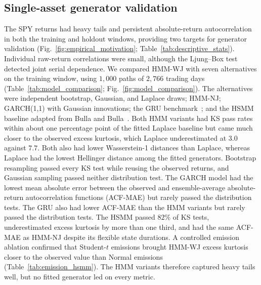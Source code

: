 \subsection{Single-asset generator validation}

The SPY returns had heavy tails and persistent absolute-return
autocorrelation in both the training and holdout windows, providing
two targets for generator validation
(Fig.~\ref{fig:empirical_motivation};
Table~\ref{tab:descriptive_stats}). Individual raw-return correlations
were small, although the Ljung--Box test detected joint serial
dependence. We compared HMM-WJ with seven alternatives on the training
window, using $1{,}000$ paths of $2{,}766$ trading days
(Table~\ref{tab:model_comparison}; Fig.~\ref{fig:model_comparison}).
The alternatives were independent bootstrap, Gaussian, and Laplace
draws; HMM-NJ; GARCH(1,1) with Gaussian innovations; the GRU
benchmark~\cite{choEtAl2014gru}; and the HSMM baseline adapted from
Bulla and Bulla~\cite{bullaBulla2006}. Both HMM variants had KS pass
rates within about one percentage point of the fitted Laplace
baseline but came much closer to the observed excess kurtosis, which
Laplace underestimated at $3.0$ against $7.7$. Both also had lower
Wasserstein-1 distances than Laplace, whereas Laplace had the lowest
Hellinger distance among the fitted generators. Bootstrap resampling
passed every KS test while reusing the observed returns, and Gaussian
sampling passed neither distribution test. The GARCH model had the
lowest mean absolute error between the observed and ensemble-average
absolute-return autocorrelation functions (ACF-MAE) but rarely passed
the distribution tests. The GRU also had lower ACF-MAE than the
HMM variants but rarely passed the distribution tests. The HSMM
passed $82\%$ of KS tests, underestimated excess kurtosis by more than
one third, and had the same ACF-MAE as HMM-NJ despite its flexible
state durations. A controlled emission ablation confirmed that
Student-$t$ emissions brought HMM-WJ excess kurtosis closer to the
observed value than Normal emissions
(Table~\ref{tab:emission_hsmm}). The HMM variants therefore captured
heavy tails well, but no fitted generator led on every metric.

